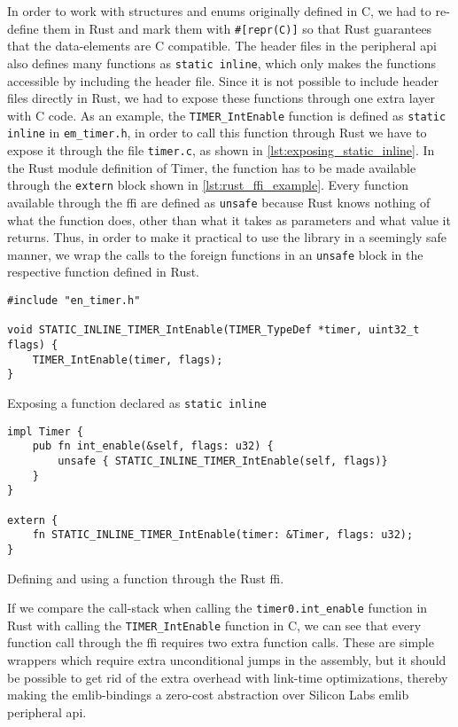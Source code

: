 In order to work with structures and enums originally defined in C, we had to re-define them in Rust
and mark them with \texttt{\#[repr(C)]} so that Rust guarantees that the data-elements are C
compatible. The header files in the peripheral \gls{api} also defines many functions as
\texttt{static inline}, which only makes the functions accessible by including the header file.
Since it is not possible to include header files directly in Rust, we had to expose these functions
through one extra layer with C code. As an example, the \texttt{TIMER\_IntEnable} function is defined
as \texttt{static inline} in \texttt{em\_timer.h}, in order to call this function through Rust we
have to expose it through the file \texttt{timer.c}, as shown in
\autoref{lst:exposing_static_inline}. In the Rust module definition of Timer, the function has to
be made available through the \texttt{extern} block shown in \autoref{lst:rust_ffi_example}. Every
function available through the \gls{ffi} are defined as \texttt{unsafe} because Rust knows nothing
of what the function does, other than what it takes as parameters and what value it returns. Thus,
in order to make it practical to use the library in a seemingly safe manner, we wrap the calls to
the foreign functions in an \texttt{unsafe} block in the respective function defined in Rust.

\begin{listing}[tb]
\begin{verbatim}
#include "en_timer.h"

void STATIC_INLINE_TIMER_IntEnable(TIMER_TypeDef *timer, uint32_t flags) {
    TIMER_IntEnable(timer, flags);
}
\end{verbatim}
\caption{Exposing a function declared as \texttt{static inline}}
\label{lst:exposing_static_inline}
\end{listing}


\begin{listing}[tb]
\begin{verbatim}
impl Timer {
    pub fn int_enable(&self, flags: u32) {
        unsafe { STATIC_INLINE_TIMER_IntEnable(self, flags)}
    }
}

extern {
    fn STATIC_INLINE_TIMER_IntEnable(timer: &Timer, flags: u32);
}
\end{verbatim}
\caption{Defining and using a function through the Rust \gls{ffi}.}
\label{lst:rust_ffi_example}
\end{listing}

If we compare the call-stack when calling the \texttt{timer0.int\_enable} function in Rust with
calling the \texttt{TIMER\_IntEnable} function in C, we can see that every function call through the
\gls{ffi} requires two extra function calls. These are simple wrappers which require extra
unconditional jumps in the assembly, but it should be possible to get rid of the extra overhead
with link-time optimizations, thereby making the emlib-bindings a zero-cost abstraction over
Silicon Labs emlib peripheral \gls{api}.


